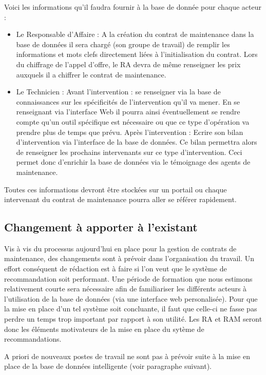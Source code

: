 Voici les informations qu'il faudra fournir à la base de donnée pour chaque acteur : 
\begin{itemize}
\item Le Responsable d'Affaire : A la création du contrat de maintenance dans la base de données il sera chargé (son groupe de travail) de remplir les informations et mots clefs directement liées à l'initialisation du contrat. Lors du chiffrage de l'appel d'offre, le RA devra de même renseigner les prix auxquels il a chiffrer le contrat de maintenance.
\item Le Technicien : Avant l'intervention : se renseigner via la base de connaissances sur les spécificités de l'intervention qu'il va mener. En se renseignant via l'interface Web il pourra ainsi éventuellement se rendre compte qu'un outil spécifique est nécessaire ou que ce type d'opération va prendre plus de temps que prévu.
Après l'intervention : Ecrire son bilan d'intervention via l'interface de la base de données. Ce bilan permettra alors de renseigner les prochains intervenants sur ce type d'intervention. Ceci permet donc d'enrichir la base de données via le témoignage des agents de maintenance.
\end{itemize}
Toutes ces informations devront être stockées sur un portail ou chaque intervenant du contrat de maintenance pourra aller se référer rapidement.

\subsection{Changement à apporter à l'existant}
Vis à vis du processus aujourd'hui en place pour la gestion de contrats de maintenance, des changements sont à prévoir dans l'organisation du travail. Un effort conséquent de rédaction est à faire si l'on veut que le système de recommandation soit performant. Une période de formation que nous estimons relativement courte sera nécessaire afin de familiariser les différents acteurs à l'utilisation de la base de données (via une interface web personalisée). Pour que la mise en place d'un tel système soit concluante, il faut que celle-ci ne fasse pas perdre un temps trop important par rapport à son utilité. Les RA et RAM seront donc les éléments motivateurs de la mise en place du sytème de recommandations.

A priori de nouveaux postes de travail ne sont pas à prévoir suite à la mise en place de la \og base de données intelligente \fg (voir paragraphe suivant).

